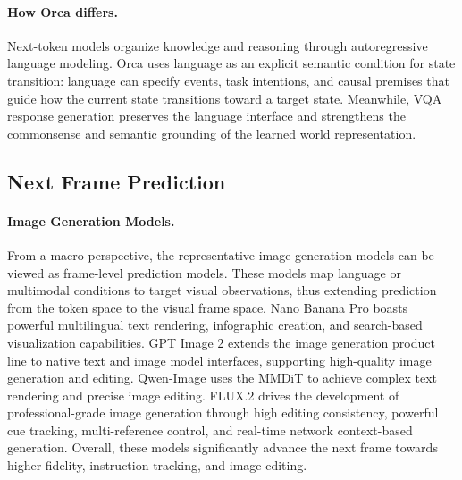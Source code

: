 \vspace{-0.5em}
\paragraph{How Orca differs.}
Next-token models organize knowledge and reasoning through autoregressive language modeling.
Orca uses language as an explicit semantic condition for state transition: language can specify events, task intentions, and causal premises that guide how the current state transitions toward a target state.
Meanwhile, VQA response generation preserves the language interface and strengthens the commonsense and semantic grounding of the learned world representation.


\vspace{-1em}
\subsection{Next Frame Prediction}\label{sec:nfp}
\vspace{-0.5em}
\paragraph{Image Generation Models.}\label{sec:vgms}
From a macro perspective, the representative image generation models can be viewed as frame-level prediction models. These models map language or multimodal conditions to target visual observations, thus extending prediction from the token space to the visual frame space. Nano Banana Pro  \citep{nanobananapro} boasts powerful multilingual text rendering, infographic creation, and search-based visualization capabilities. GPT Image 2 \citep{ChatGPT-Images-2.0} extends the image generation product line to native text and image model interfaces, supporting high-quality image generation and editing. Qwen-Image \citep{Qwen-image} uses the MMDiT \citep{SD3} to achieve complex text rendering and precise image editing. FLUX.2 \citep{flux2} drives the development of professional-grade image generation through high editing consistency, powerful cue tracking, multi-reference control, and real-time network context-based generation. Overall, these models significantly advance the next frame towards higher fidelity, instruction tracking, and image editing.


\vspace{-0.5em}
